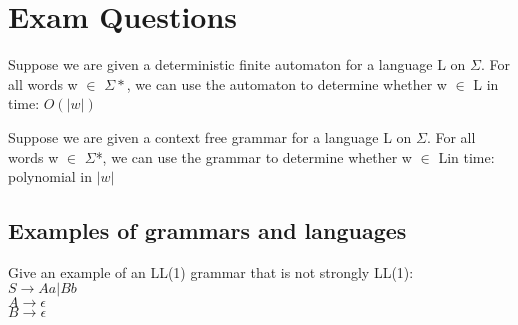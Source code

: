 \section{Exam Questions}

Suppose we are given a deterministic finite automaton for a language L on $\Sigma$. For all words w $\in$ $\Sigma *$, we can use the automaton to determine whether w $\in$ L in time: $O ( |w| )$

Suppose we are given a context free grammar for a language L on $\Sigma$. For all words w $\in$ $\Sigma$*, we can use the grammar to determine whether w $\in$ Lin time: polynomial in $|w|$


\subsection{Examples of grammars and languages}
Give an example of an LL(1) grammar that is not strongly LL(1):\\

$S \rightarrow A a | B b$\\
$A \rightarrow \epsilon$\\
$B \rightarrow \epsilon$\\




